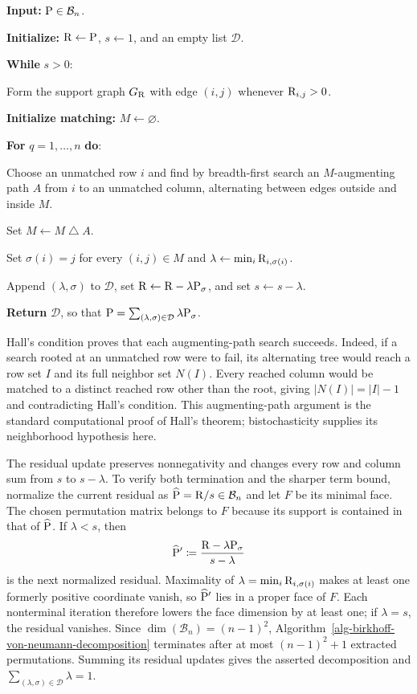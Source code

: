 \begin{alg}\label{alg-birkhoff-von-neumann-decomposition}
\textbf{Input:} $\P\in\mathcal B_n$.

\textbf{Initialize:} $\R\leftarrow\P$, $s\leftarrow1$, and an empty list $\mathcal D$.

\textbf{While} $s>0$:
\begin{algblock}
	Form the support graph $G_{\R}$ with edge $(i,j)$ whenever $\R_{i,j}>0$.

	\textbf{Initialize matching:} $M\leftarrow\varnothing$.

	\textbf{For} $q=1,\ldots,n$ \textbf{do}:
	\begin{algblock}
		Choose an unmatched row $i$ and find by breadth-first search an $M$-augmenting path $A$ from $i$ to an unmatched column, alternating between edges outside and inside $M$.

		Set $M\leftarrow M\mathbin{\triangle}A$.
	\end{algblock}

	Set $\sigma(i)=j$ for every $(i,j)\in M$ and $\lambda\leftarrow\min_i\R_{i,\sigma(i)}$.

	Append $(\lambda,\sigma)$ to $\mathcal D$, set $\R\leftarrow\R-\lambda\P_\sigma$, and set $s\leftarrow s-\lambda$.
\end{algblock}

\textbf{Return} $\mathcal D$, so that $\P=\sum_{(\lambda,\sigma)\in\mathcal D}\lambda\P_\sigma$.
\end{alg}

Hall's condition proves that each augmenting-path search succeeds. Indeed, if a search rooted at an unmatched row were to fail, its alternating tree would reach a row set $I$ and its full neighbor set $N(I)$. Every reached column would be matched to a distinct reached row other than the root, giving $|N(I)|=|I|-1$ and contradicting Hall's condition. This augmenting-path argument is the standard computational proof of Hall's theorem; bistochasticity supplies its neighborhood hypothesis here.

The residual update preserves nonnegativity and changes every row and column sum from $s$ to $s-\lambda$. To verify both termination and the sharper term bound, normalize the current residual as $\widehat\P=\R/s\in\mathcal B_n$ and let $F$ be its minimal face. The chosen permutation matrix belongs to $F$ because its support is contained in that of $\widehat\P$. If $\lambda<s$, then
\[
	\widehat\P'
	\eqdef
	\frac{\R-\lambda\P_\sigma}{s-\lambda}
\]
is the next normalized residual. Maximality of $\lambda=\min_i\R_{i,\sigma(i)}$ makes at least one formerly positive coordinate vanish, so $\widehat\P'$ lies in a proper face of $F$. Each nonterminal iteration therefore lowers the face dimension by at least one; if $\lambda=s$, the residual vanishes. Since $\dim(\mathcal B_n)=(n-1)^2$, Algorithm~\ref{alg-birkhoff-von-neumann-decomposition} terminates after at most $(n-1)^2+1$ extracted permutations. Summing its residual updates gives the asserted decomposition and $\sum_{(\lambda,\sigma)\in\mathcal D}\lambda=1$.


